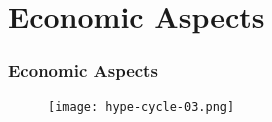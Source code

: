 \section{Economic Aspects}

\begin{frame}
\frametitle{Economic Aspects}

\begin{center}
  \begin{figure}
    \texttt{[image: hype-cycle-03.png]}
  \end{figure}
\end{center}

\end{frame}
